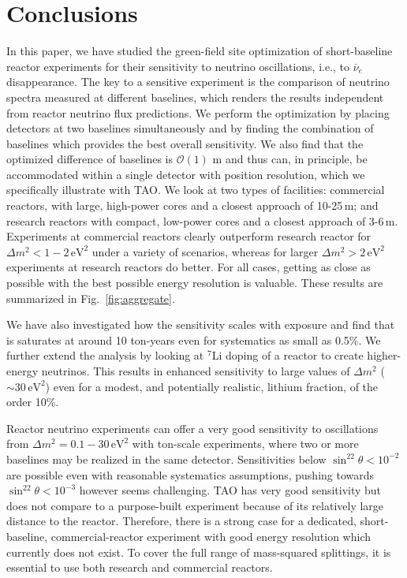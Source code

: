 \documentclass[prd, twocolumn, tightenlines, twoside, secnumarabic, superscriptaddress, preprintnumbers, nofootinbib, notitlepage]{revtex4-1}
\begin{document}
\section{Conclusions}
\label{sec:con}
\setcounter{equation}{0}

In this paper, we have studied the green-field site optimization of short-baseline reactor experiments for their sensitivity to neutrino oscillations, i.e., to $\overline{\nu}_e$ disappearance. The key to a sensitive experiment is the comparison of neutrino spectra measured at different baselines, which renders the results independent from reactor neutrino flux predictions. We perform the optimization by placing detectors at two baselines simultaneously and by finding the combination of baselines which provides the best overall sensitivity. We also find that the optimized difference of baselines is $\mathcal{O}(1)$ m and thus can, in principle, be accommodated within a single detector with position resolution, which we specifically illustrate with TAO. We look at two types of facilities: commercial reactors, with large, high-power cores and a closest approach of 10-25\,m; and research reactors with compact, low-power cores and a closest approach of 3-6\,m. Experiments at commercial reactors clearly outperform research reactor for $\Delta m^2<1-2\,\mathrm{eV}^2$ under a variety of scenarios, whereas for larger $\Delta m^2>2\,\mathrm{eV}^2$ experiments at research reactors do better. For all cases, getting as close as possible with the best possible energy resolution is valuable. These results are summarized in Fig.~\ref{fig:aggregate}.

We have also investigated how the sensitivity scales with exposure and find that is saturates at around 10 ton-years even for systematics as small as 0.5\%. We further extend the analysis by looking at $^7$Li doping of a reactor to create higher-energy neutrinos. This results in enhanced sensitivity to large values of $\Delta m^2$  ($\sim30\,\mathrm{eV}^2$) even for a modest, and potentially realistic, lithium fraction, of the order 10\%. 

Reactor neutrino experiments can offer a very good sensitivity to oscillations from $\Delta m^2 = 0.1-30\,\mathrm{eV}^2$ with ton-scale experiments, where two or more baselines may be realized in the same detector. Sensitivities below $\sin^22\theta<10^{-2}$ are possible even with reasonable systematics assumptions, pushing towards $\sin^22\theta<10^{-3}$ however seems challenging.  TAO has very good sensitivity but does not compare to a purpose-built experiment because of its relatively large distance to the reactor. Therefore, there is a strong case for a dedicated, short-baseline, commercial-reactor experiment with good energy resolution which currently does not exist. To cover the full range of mass-squared splittings, it is essential to use both research and commercial reactors.
\end{document}
